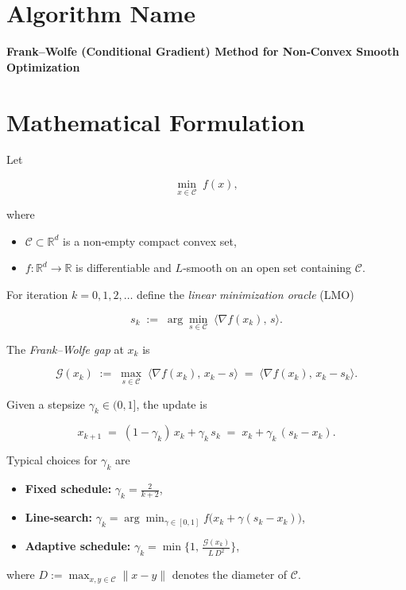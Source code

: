 \documentclass{article}
\newcommand{\gap}{\mathcal{G}}
\newcommand{\diam}{D}
\begin{document}
\section*{Algorithm Name}
\textbf{Frank–Wolfe (Conditional Gradient) Method for Non‑Convex Smooth Optimization}
\section*{Mathematical Formulation}
Let  

\[
\min_{x\in\mathcal C} \; f(x),
\]

where  

\begin{itemize}
  \item $\mathcal C\subset\mathbb R^{d}$ is a non‑empty compact convex set,
  \item $f:\mathbb R^{d}\rightarrow\mathbb R$ is differentiable and $L$‑smooth on an open set containing $\mathcal C$.
\end{itemize}

For iteration $k=0,1,2,\dots$ define the \emph{linear minimization oracle} (LMO)

\[
s_{k}\;:=\;\arg\min_{s\in\mathcal C}\;\big\langle \nabla f(x_{k}) ,\, s\big\rangle .
\tag{1}
\]

The \emph{Frank–Wolfe gap} at $x_{k}$ is  

\[
\gap(x_{k})\;:=\;\max_{s\in\mathcal C}\;\big\langle \nabla f(x_{k}),\,x_{k}-s\big\rangle
               \;=\;\big\langle \nabla f(x_{k}),\,x_{k}-s_{k}\big\rangle .
\tag{2}
\]

Given a stepsize $\gamma_{k}\in(0,1]$, the update is  

\[
x_{k+1}\;=\;(1-\gamma_{k})\,x_{k}+ \gamma_{k}\,s_{k}
          \;=\;x_{k}+ \gamma_{k}\,(s_{k}-x_{k}).                           
\tag{3}
\]

Typical choices for $\gamma_{k}$ are  

\begin{itemize}
  \item \textbf{Fixed schedule:} $\displaystyle\gamma_{k}= \frac{2}{k+2}$,
  \item \textbf{Line‑search:} $\displaystyle\gamma_{k}= \arg\min_{\gamma\in[0,1]}
          f\big(x_{k}+ \gamma (s_{k}-x_{k})\big)$,
  \item \textbf{Adaptive schedule:} $\displaystyle\gamma_{k}= \min\Big\{1,\,
          \frac{\gap(x_{k})}{L\,\diam^{2}}\Big\}$,
\end{itemize}
where $\diam:=\max_{x,y\in\mathcal C}\|x-y\|$ denotes the diameter of $\mathcal C$.
\end{document}
